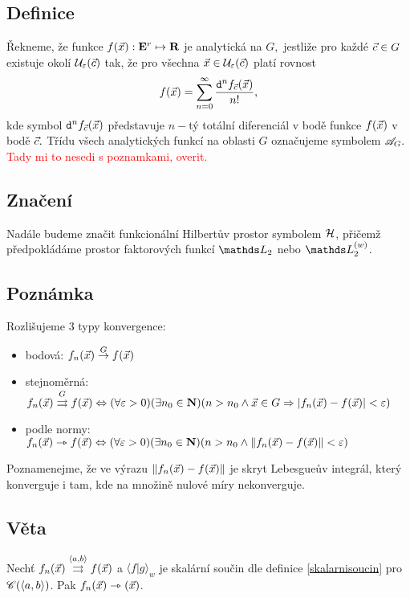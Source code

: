 \subsection{Definice}

\v Rekneme, \v ze funkce $f({\vec{x}}):{{\mathbf E}^r}\mapsto{\mathbf R}$ je analytick\'a na $G,$ jestli\v ze pro ka\v zd\'e ${\vec{c}}\in G$ existuje okol\'i ${\mathcal U}_\varepsilon({\vec{c}})$ tak, \v ze pro v\v sechna ${\vec{x}}\in {\mathcal U}_\varepsilon({\vec{c}})$ plat\'i rovnost
%
$$f({\vec{x}})=\sum_{n=0}^{\infty} \frac{\mathtt{d}^n f_{{\vec{c}}} ({\vec{x}}) }{n!},$$
%
kde symbol $\mathtt{d}^n f_{{\vec{c}}} ({\vec{x}})$ p\v redstavuje $n-$t\'y tot\'aln\'i diferenci\'al v bod\v e funkce $f({\vec{x}})$ v bod\v e ${\vec{c}}.$ T\v r\'idu v\v sech analytick\'ych funkc\'i na oblasti $G$ ozna\v cujeme symbolem ${\mathscr A}_G.$ \textcolor{red}{Tady mi to nesedi s poznamkami, overit.}

\subsection{Zna\v cen\'i}
Nad\'ale budeme zna\v cit funkcion\'aln\'i Hilbert\r uv prostor symbolem ${\mathcal H}$, p\v ri\v cem\v z p\v redpokl\'ad\'ame prostor faktorov\'ych funkc\'i $\LL_2$ nebo $\LL_2^{(w)}$.

\subsection{Pozn\'amka}
Rozli\v sujeme 3 typy konvergence:
\begin{itemize}
\item bodov\'a: $f_n({\vec{x}})\overset{G}{\rightarrow}f({\vec{x}})$
\item stejnom\v ern\'a: $f_n({\vec{x}})\overset{G}{\rightrightarrows}f({\vec{x}})\Leftrightarrow (\forall \varepsilon >0)(\exists n_0\in{\mathbf N})(n>n_0 \wedge{\vec{x}}\in G\Rightarrow |f_n({\vec{x}})-f({\vec{x}})|<\varepsilon)$
\item podle normy: $f_n({\vec{x}})\rightarrowtriangle f({\vec{x}}) \Leftrightarrow (\forall \varepsilon >0)(\exists n_0\in{\mathbf N})(n>n_0 \wedge \|f_n({\vec{x}})-f({\vec{x}})\|<\varepsilon)$  
\end{itemize}
Poznamenejme, \v ze ve v\'yrazu $\|f_n({\vec{x}})-f({\vec{x}})\|$ je skryt Lebesgue\r uv integr\'al, kter\'y konverguje i tam, kde na mno\v zin\v e nulov\'e m\'iry nekonverguje.

\subsection{V\v eta}
Nech\v t $f_n({\vec{x}})\overset{\langle a,b\rangle}{\rightrightarrows}f({\vec{x}})$ a $\langle f|g\rangle_w$ je skal\'arn\'i sou\v cin dle definice \ref{skalarnisoucin} pro $\mathscr{C}(\langle a,b\rangle)$. Pak $f_n({\vec{x}})\rightarrowtriangle({\vec{x}})$.\\

